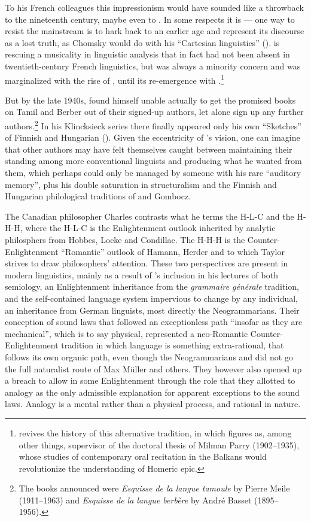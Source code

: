 \documentclass[output=paper]{langscibook}
\begin{document}
To his French colleagues this impressionism would have sounded like a throwback to the nineteenth century, maybe even to \citet{Rousseau1782175561}. In some respects it is — one way to resist the mainstream is to hark back to an earlier age and represent its discourse as a lost truth, as Chomsky would do with his ``Cartesian linguistics'' (\citeyear{Chomsky20091966}). {\Sauvageot} is rescuing a musicality in linguistic analysis that in fact had not been absent in twentieth-century French linguistics, but was always a minority concern and was marginalized with the rise of , until its re-emergence with {\Meschonnic}.\footnote{\citet{Saussy2016} revives the history of this alternative tradition, in which {\Meillet} figures as, among other things, supervisor of the doctoral thesis of Milman Parry (1902--1935), whose studies of contemporary oral recitation in the Balkans would revolutionize the understanding of Homeric epic.}

But by the late 1940s, {\Sauvageot} found himself unable actually to get the prom\-ised books on Tamil and Berber out of their signed-up authors, let alone sign up any further authors.\footnote{The books announced were \emph{Esquisse de la langue tamoule} by Pierre Meile (1911--1963) and \emph{Esquisse de la langue berbère} by André Basset (1895--1956).} In his Klincksieck series there finally appeared only his own ``Sketches'' of Finnish and Hungarian (\citeyear{Sauvageot1951}). Given the eccentricity of {\Sauvageot}'s vision, one can imagine that other authors may have felt themselves caught between maintaining their standing among more conventional linguists and producing what he wanted from them, which perhaps could only be managed by someone with his rare ``auditory memory'', plus his double saturation in structuralism and the Finnish and Hungarian philological traditions of {} and Gombocz.

The Canadian philosopher Charles \citet{Taylor2016} contrasts what he terms the H-L-C and the H-H-H, where the H-L-C is the Enlightenment outlook inherited by analytic philosphers from Hobbes, Locke and Condillac. The H-H-H is the Counter-Enlightenment ``Romantic'' outlook of Hamann, Herder and {\Humboldt} to which Taylor strives to draw philosophers' attention. These two perspectives are present in modern linguistics, mainly as a result of {\Saussure}'s inclusion in his lectures of both semiology, an Enlightenment inheritance from the \emph{grammaire générale} tradition, and the self-contained language system impervious to change by any individual, an inheritance from German linguists, most directly the Neogrammarians. Their conception of sound laws that followed an exceptionless path ``insofar as they are mechanical'', which is to say physical, represented a neo-Romantic Counter-Enlightenment tradition in which language is something extra-rational, that follows its own organic path, even though the Neogrammarians and {\Saussure} did not go the full naturalist route of Max Müller and others. They however also opened up a breach to allow in some Enlightenment through the role that they allotted to analogy as the only admissible explanation for apparent exceptions to the sound laws. Analogy is a mental rather than a physical process, and rational in nature.
\end{document}

